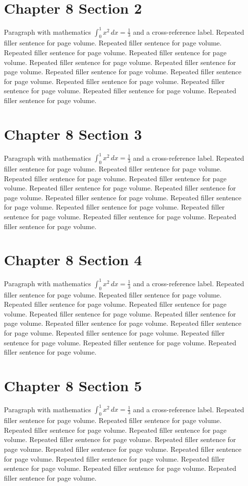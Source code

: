 \documentclass[11pt]{report}
\begin{document}
\section{Chapter 8 Section 2}
Paragraph with mathematics $\int_0^1 x^2\,dx = \frac13$ and a cross-reference label.
\label{sec:8:2}
Repeated filler sentence for page volume. Repeated filler sentence for page volume. Repeated filler sentence for page volume. Repeated filler sentence for page volume. Repeated filler sentence for page volume. Repeated filler sentence for page volume. Repeated filler sentence for page volume. Repeated filler sentence for page volume. Repeated filler sentence for page volume. Repeated filler sentence for page volume. Repeated filler sentence for page volume. Repeated filler sentence for page volume. 
\section{Chapter 8 Section 3}
Paragraph with mathematics $\int_0^1 x^2\,dx = \frac13$ and a cross-reference label.
\label{sec:8:3}
Repeated filler sentence for page volume. Repeated filler sentence for page volume. Repeated filler sentence for page volume. Repeated filler sentence for page volume. Repeated filler sentence for page volume. Repeated filler sentence for page volume. Repeated filler sentence for page volume. Repeated filler sentence for page volume. Repeated filler sentence for page volume. Repeated filler sentence for page volume. Repeated filler sentence for page volume. Repeated filler sentence for page volume. 
\section{Chapter 8 Section 4}
Paragraph with mathematics $\int_0^1 x^2\,dx = \frac13$ and a cross-reference label.
\label{sec:8:4}
Repeated filler sentence for page volume. Repeated filler sentence for page volume. Repeated filler sentence for page volume. Repeated filler sentence for page volume. Repeated filler sentence for page volume. Repeated filler sentence for page volume. Repeated filler sentence for page volume. Repeated filler sentence for page volume. Repeated filler sentence for page volume. Repeated filler sentence for page volume. Repeated filler sentence for page volume. Repeated filler sentence for page volume. 
\section{Chapter 8 Section 5}
Paragraph with mathematics $\int_0^1 x^2\,dx = \frac13$ and a cross-reference label.
\label{sec:8:5}
Repeated filler sentence for page volume. Repeated filler sentence for page volume. Repeated filler sentence for page volume. Repeated filler sentence for page volume. Repeated filler sentence for page volume. Repeated filler sentence for page volume. Repeated filler sentence for page volume. Repeated filler sentence for page volume. Repeated filler sentence for page volume. Repeated filler sentence for page volume. Repeated filler sentence for page volume. Repeated filler sentence for page volume. 
\end{document}
